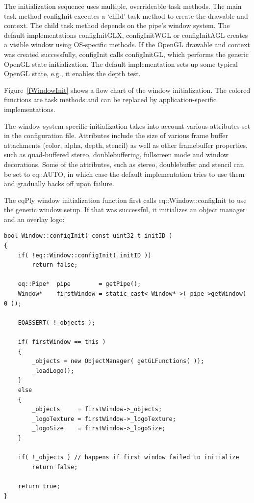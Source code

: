 \documentclass[10pt,a4]{scrartcl}
\newcommand{\fig}[1]{Figure~\ref{#1}}
\begin{document}
The initialization sequence uses multiple, overrideable task
methods. The main task method \textsf{configInit} executes a `child'
task method to create the drawable and context. The child task method
depends on the pipe's window system. The default implementations
\textsf{configInitGLX}, \textsf{configInitWGL} or \textsf{configInitAGL}
creates a visible window using OS-specific methods. If the OpenGL
drawable and context was created successfully, \textsf{configInit} calls
\textsf{configInitGL}, which performs the generic OpenGL state
initialization. The default implementation sets up some typical OpenGL
state, e.g., it enables the depth test.

\fig{fWindowInit} shows a flow chart of the window initialization. The
colored functions are task methods and can be replaced by
application-specific implementations.

The window-system specific initialization takes into account various
attributes set in the configuration file. Attributes include the size of
various frame buffer attachments (color, alpha, depth, stencil) as well
as other framebuffer properties, such as quad-buffered stereo,
doublebuffering, fullscreen mode and window decorations. Some of the
attributes, such as stereo, doublebuffer and stencil can be set to
\textsf{eq::AUTO}, in which case the default implementation tries to use
them and gradually backs off upon failure.

The \textsf{eqPly} window initialization function first calls
\textsf{eq::Window::configInit} to use the generic window setup. If that
was successful, it initializes an object manager and an overlay logo:

{\footnotesize\begin{lstlisting}
bool Window::configInit( const uint32_t initID )
{
    if( !eq::Window::configInit( initID ))
        return false;

    eq::Pipe*  pipe        = getPipe();
    Window*    firstWindow = static_cast< Window* >( pipe->getWindow( 0 ));

    EQASSERT( !_objects );

    if( firstWindow == this )
    {
        _objects = new ObjectManager( getGLFunctions( ));
        _loadLogo();
    }
    else
    {
        _objects     = firstWindow->_objects;
        _logoTexture = firstWindow->_logoTexture;
        _logoSize    = firstWindow->_logoSize;
    }

    if( !_objects ) // happens if first window failed to initialize
        return false;

    return true;
}
\end{lstlisting}}
\end{document}
